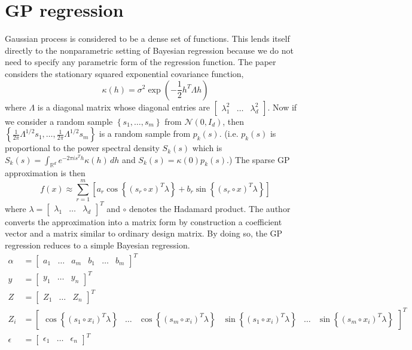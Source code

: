 \documentclass[11pt]{article}
\newcommand{\RR}{\mathbb{R}} %
\begin{document}
\section{GP regression}
Gaussian process is considered to be a dense set of functions. This lends itself directly to the nonparametric setting of Bayesian regression because we do not need to specify any parametric form of the regression function. The paper considers the stationary squared exponential covariance function,
$$
  \kappa \left(h\right) = \sigma^{2}\exp \left(-\frac{1}{2}h^{T}\Lambda h\right)
$$
where $\Lambda$ is a diagonal matrix whose diagonal entries are $ \begin{bmatrix}\lambda_{1}^{2} & \ldots & \lambda_{d}^{2} \end{bmatrix}$. Now if we consider a random sample $\left\{s_{1}, \ldots , s_{m} \right\}$ from $\mathcal{N}\left(0,I_{d}\right)$, then $\left\{\frac{1}{2\pi}\Lambda^{1/2} s_{1}, \ldots , \frac{1}{2\pi}\Lambda^{1/2}s_{m} \right\}$ is a random sample from $p_{k}\left(s\right)$. (i.e. $p_{k}\left(s\right)$ is proportional to the power spectral density $S_{k}\left(s\right)$ which is $S_{k}\left(s\right) = \int_{\RR^{d}} e^{-2\pi i s^{T}h}\kappa \left(h\right)\, dh$ and $S_{k}\left(s\right) = \kappa \left(0\right)p_{k}\left(s\right)$.) The sparse GP approximation is then
$$
  f\left(x\right) \approx \sum_{r=1}^{m} \left[a_{r} \cos \left\{\left(s_{r} \circ x \right)^{T}\lambda \right\} +b_{r} \sin \left\{\left(s_{r}\circ x\right)^{T}\lambda \right\} \right]
$$
where $\lambda = \begin{bmatrix}\lambda_{1} & \ldots & \lambda_{d}  \end{bmatrix}^{T}$ and $\circ$ denotes the Hadamard product. The author converts the approximation into a matrix form by construction a coefficient vector and a matrix similar to ordinary design matrix. By doing so, the GP regression reduces to a simple Bayesian regression.
\begin{align*}
  \alpha &= \begin{bmatrix} a_{1} & \ldots & a_{m} & b_{1} & \ldots & b_{m} \end{bmatrix}^{T} \\
  y &= \begin{bmatrix} y_{1} & \ldots & y_{n}\end{bmatrix}^{T} \\
  Z &= \begin{bmatrix} Z_{1} & \ldots & Z_{n} \end{bmatrix}^{T} \\
  Z_{i} &= \begin{bmatrix} \cos \left\{\left(s_{1} \circ x_{i} \right)^{T}\lambda \right\} & \ldots & \cos \left\{\left(s_{m}\circ x_{i}\right)^{T}\lambda \right\} & \sin \left\{\left(s_{1}\circ x_{i}\right)^{T}\lambda \right\} & \ldots & \sin \left\{\left(s_{m}\circ x_{i}\right)^{T}\lambda \right\} \end{bmatrix}^{T}\\
  \epsilon &= \begin{bmatrix} \epsilon_{1} & \ldots & \epsilon_{n} \end{bmatrix}^{T}
\end{align*}
\end{document}
